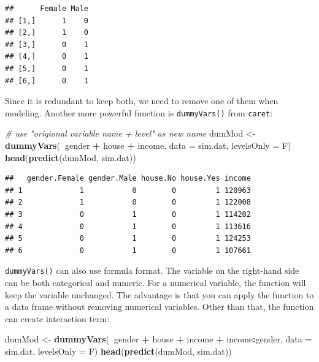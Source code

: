 \documentclass[12pt,]{krantz}
\makeatletter
\newenvironment{Shaded}{\begin{snugshade}}{\end{snugshade}}
\newcommand{\CommentTok}[1]{\textcolor[rgb]{0.37,0.37,0.37}{\textit{#1}}}
\newcommand{\DataTypeTok}[1]{\textcolor[rgb]{0.27,0.27,0.27}{#1}}
\newcommand{\KeywordTok}[1]{\textcolor[rgb]{0.27,0.27,0.27}{\textbf{#1}}}
\newcommand{\NormalTok}[1]{#1}
\newcommand{\OperatorTok}[1]{\textcolor[rgb]{0.43,0.43,0.43}{\textbf{#1}}}
\newcommand{\StringTok}[1]{\textcolor[rgb]{0.5,0.5,0.5}{#1}}
\newenvironment{kframe}{%
\medskip{}
\setlength{\fboxsep}{.8em}
 \def\at@end@of@kframe{}%
 \ifinner\ifhmode%
  \def\at@end@of@kframe{\end{minipage}}%
  \begin{minipage}{\columnwidth}%
 \fi\fi%
 \def\FrameCommand##1{\hskip\@totalleftmargin \hskip-\fboxsep
 \colorbox{shadecolor}{##1}\hskip-\fboxsep
     \hskip-\linewidth \hskip-\@totalleftmargin \hskip\columnwidth}%
 \MakeFramed {\advance\hsize-\width
   \@totalleftmargin\z@ \linewidth\hsize
   \@setminipage}}%
 {\par\unskip\endMakeFramed%
 \at@end@of@kframe}
\renewenvironment{Shaded}{\begin{kframe}}{\end{kframe}}
\makeatother
\begin{document}
\begin{verbatim}
##      Female Male
## [1,]      1    0
## [2,]      1    0
## [3,]      0    1
## [4,]      0    1
## [5,]      0    1
## [6,]      0    1
\end{verbatim}

Since it is redundant to keep both, we need to remove one of them when modeling. Another more powerful function is \texttt{dummyVars()} from \texttt{caret}:

\begin{Shaded}
\begin{Highlighting}[]
\CommentTok{# use "origional variable name + level" as new name}
\NormalTok{dumMod <-}\StringTok{ }\KeywordTok{dummyVars}\NormalTok{(}\OperatorTok{~}\NormalTok{gender }\OperatorTok{+}\StringTok{ }\NormalTok{house }\OperatorTok{+}\StringTok{ }\NormalTok{income, }
                    \DataTypeTok{data =}\NormalTok{ sim.dat, }
                    \DataTypeTok{levelsOnly =}\NormalTok{ F)}
\KeywordTok{head}\NormalTok{(}\KeywordTok{predict}\NormalTok{(dumMod, sim.dat))}
\end{Highlighting}
\end{Shaded}

\begin{verbatim}
##   gender.Female gender.Male house.No house.Yes income
## 1             1           0        0         1 120963
## 2             1           0        0         1 122008
## 3             0           1        0         1 114202
## 4             0           1        0         1 113616
## 5             0           1        0         1 124253
## 6             0           1        0         1 107661
\end{verbatim}

\texttt{dummyVars()} can also use formula format. The variable on the right-hand side can be both categorical and numeric. For a numerical variable, the function will keep the variable unchanged. The advantage is that you can apply the function to a data frame without removing numerical variables. Other than that, the function can create interaction term:

\begin{Shaded}
\begin{Highlighting}[]
\NormalTok{dumMod <-}\StringTok{ }\KeywordTok{dummyVars}\NormalTok{(}\OperatorTok{~}\NormalTok{gender }\OperatorTok{+}\StringTok{ }\NormalTok{house }\OperatorTok{+}\StringTok{ }\NormalTok{income }\OperatorTok{+}\StringTok{ }\NormalTok{income}\OperatorTok{:}\NormalTok{gender, }
                    \DataTypeTok{data =}\NormalTok{ sim.dat, }
                    \DataTypeTok{levelsOnly =}\NormalTok{ F)}
\KeywordTok{head}\NormalTok{(}\KeywordTok{predict}\NormalTok{(dumMod, sim.dat))}
\end{Highlighting}
\end{Shaded}
\end{document}
